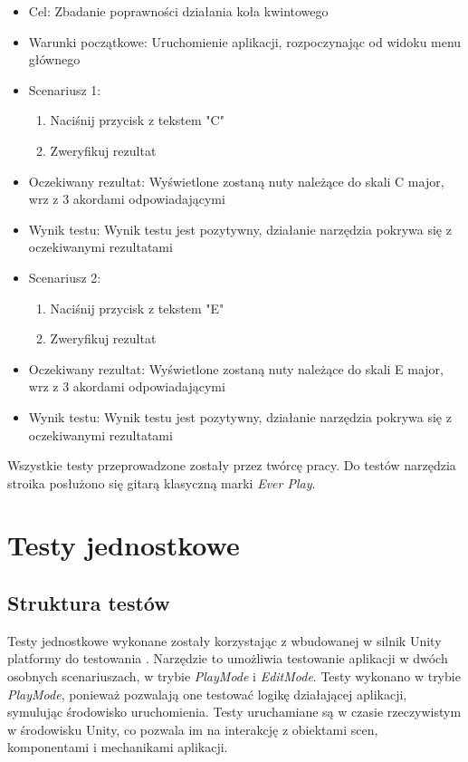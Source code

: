 \begin{itemize}
    \item Cel: Zbadanie poprawności działania koła kwintowego
    \item Warunki początkowe: Uruchomienie aplikacji, rozpoczynając od widoku menu głównego
    \item Scenariusz 1:
        \begin{enumerate}
            \item Naciśnij przycisk z tekstem "C"
            \item Zweryfikuj rezultat
        \end{enumerate}
    \item Oczekiwany rezultat: Wyświetlone zostaną nuty należące do skali C major, wrz z 3 akordami odpowiadającymi 
    \item Wynik testu: Wynik testu jest pozytywny, działanie narzędzia pokrywa się z oczekiwanymi rezultatami
    \item Scenariusz 2:
        \begin{enumerate}
            \item Naciśnij przycisk z tekstem "E"
            \item Zweryfikuj rezultat
        \end{enumerate}
    \item Oczekiwany rezultat: Wyświetlone zostaną nuty należące do skali E major, wrz z 3 akordami odpowiadającymi 
    \item Wynik testu: Wynik testu jest pozytywny, działanie narzędzia pokrywa się z oczekiwanymi rezultatami
\end{itemize}

Wszystkie testy przeprowadzone zostały przez twórcę pracy. Do testów narzędzia stroika posłużono się gitarą klasyczną marki \emph{Ever Play}.
\section{Testy jednostkowe}

\subsection{Struktura testów}

Testy jednostkowe wykonane zostały korzystając z wbudowanej w silnik Unity platformy do testowania \cite{UnityTestFramework}. Narzędzie to umożliwia testowanie aplikacji w dwóch osobnych scenariuszach, w trybie \emph{PlayMode} i \emph{EditMode}. Testy wykonano w trybie \emph{PlayMode}, ponieważ pozwalają one testować logikę działającej aplikacji, symulując środowisko uruchomienia. Testy uruchamiane są w czasie rzeczywistym w środowisku Unity, co pozwala im na interakcję z obiektami scen, komponentami i mechanikami aplikacji.

